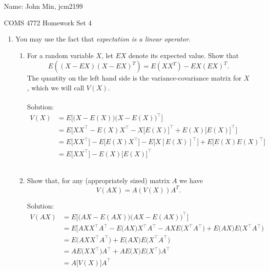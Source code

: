 \documentclass[12pt]{amsart}
\begin{document}
{\Large Name:}  John Min, jcm2199 \\
\begin{center}
\Large COMS 4772 \hskip 2in Homework Set 4
\end{center}
\bigskip



\noindent

\begin{enumerate}

\item You may use the fact that {\it expectation is a linear operator}.  
\begin{enumerate}
\item For a random variable $X$, let $EX$ denote its expected value. Show that 
\[
E\left((X-EX)(X-EX)^T\right) = E(XX^T) - EX(EX)^T.
\]
The quantity on the left hand side is the variance-covariance matrix for $X$, which we will call $V(X)$.\\ \\

\noindent
Solution: \\
\begin{align*}
V(X) &= E\bigg[ \Big(X - E(X) \Big) \Big(X-E(X) \Big)^\top \bigg] \\
	&= E\bigg[XX^\top - E(X)X^\top - X \big[E(X)\big]^\top + E(X) \big[E(X)\big]^\top \bigg] \\
	&= E \big[ XX^\top \big] - E \big[ E(X) X^\top \big] - E \big[X [E(X)]^\top \big] + E \big [ E(X) E(X)^\top \big ] \\
	&= E \big[X X^\top \big] - E(X) \big[ E(X) \big]^\top
\end{align*} \\


\item Show that, for any (appropriately sized) matrix $A$ we have
\[
V(AX) = A(V(X))A^T.
\]

\noindent
Solution: \\
\begin{align*}
V(AX) &= E\bigg[ \Big(AX - E(AX) \Big) \Big(AX-E(AX) \Big)^\top \bigg] \\
	&= E\bigg[ AXX^\top A^\top - E\Big(AX\Big)X^\top A^\top - AX E\Big(X^\top A^\top \Big) + E\Big(AX \Big) E\Big(X^\top A^\top \Big) \\
	&= E\Big(AXX^\top A^\top \Big) + E\Big(AX \Big) E \Big(X^\top A^\top \Big) \\
	&= A E\Big(XX^\top \Big) A^\top + A E \Big(X \Big) E\Big(X^\top \Big) A^\top \\
	&= A \big[V(X) \big] A^\top
\end{align*} \\



\end{enumerate}
\end{enumerate}
\end{document}
